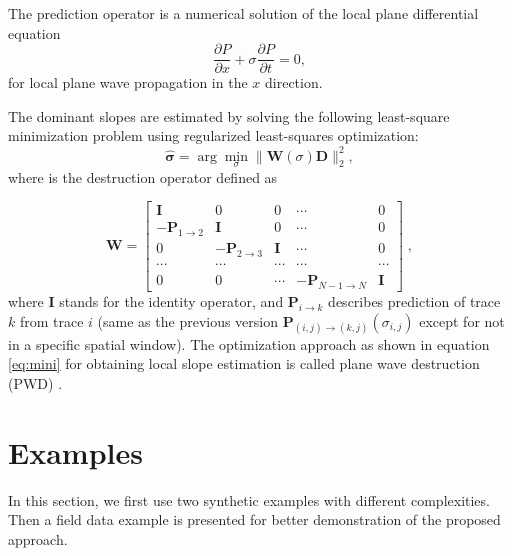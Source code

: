 The prediction operator is a numerical solution of the local plane differential equation 
\begin{equation}
\label{eq:plane}
\frac{\partial P}{\partial x} + \sigma \frac{\partial P}{\partial t} = 0,
\end{equation}
for local plane wave propagation in the $x$ direction. 

The dominant slopes are estimated by solving the following least-square minimization problem using regularized least-squares optimization:
\begin{equation}
\label{eq:mini}
\hat{\mathbf{\sigma}} = \arg\min_{\sigma} \parallel \mathbf{W}(\sigma)\mathbf{D} \parallel_2^2,
\end{equation}
where  is the destruction operator defined as 

\begin{displaymath} 
\mathbf{W} = \left[
\begin{array}{ccccc} 
\mathbf{I} & 0 & 0 & \cdots & 0\\
-\mathcal{\mathbf{P}}_{1\rightarrow 2} &\mathbf{I} & 0 &\cdots &0\\
0 &-\mathcal{\mathbf{P}}_{2\rightarrow 3} & \mathbf{I} & \cdots & 0 \\
\cdots & \cdots & \cdots & \cdots & \cdots \\
0& 0 & \cdots & - \mathcal{\mathbf{P}}_{N-1\rightarrow N} & \mathbf{I}
\end{array}\right]\;, 
\end{displaymath}
where $\mathbf{I}$ stands for the identity operator, and $\mathcal{\mathbf{P}}_{i\rightarrow k}$ describes prediction of trace $k$ from trace $i$ (same as the previous version $\mathbf{P}_{(i,j)\rightarrow(k,j)}(\sigma_{i,j})$ except for not in a specific spatial window). The optimization approach as shown in equation \ref{eq:mini} for obtaining local slope estimation is called plane wave destruction (PWD) \cite[]{fomel2002pwd}.

\section{Examples}
In this section, we first use two synthetic examples with different complexities. Then a field data example is presented for better demonstration of the proposed approach. 

